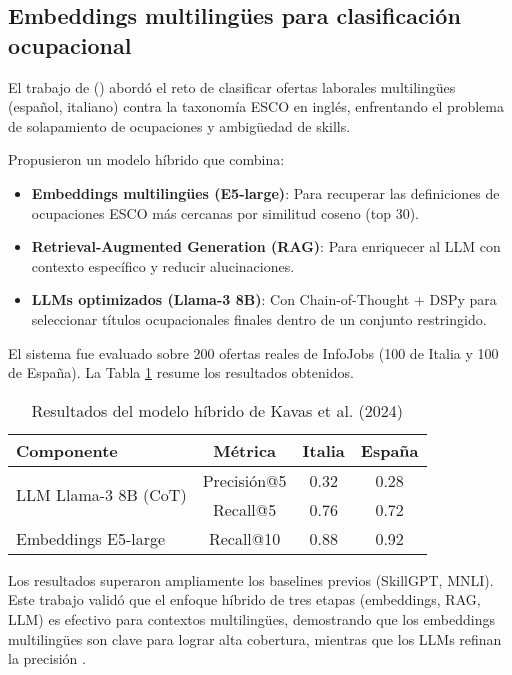 \subsection{Embeddings multilingües para clasificación ocupacional}

El trabajo de \citeauthor{kavas2024} (\citeyear{kavas2024}) abordó el reto de clasificar ofertas laborales multilingües (español, italiano) contra la taxonomía ESCO en inglés, enfrentando el problema de solapamiento de ocupaciones y ambigüedad de skills.

Propusieron un modelo híbrido que combina:

\begin{itemize}
    \item \textbf{Embeddings multilingües (E5-large)}: Para recuperar las definiciones de ocupaciones ESCO más cercanas por similitud coseno (top 30).
    \item \textbf{Retrieval-Augmented Generation (RAG)}: Para enriquecer al LLM con contexto específico y reducir alucinaciones.
    \item \textbf{LLMs optimizados (Llama-3 8B)}: Con Chain-of-Thought + DSPy para seleccionar títulos ocupacionales finales dentro de un conjunto restringido.
\end{itemize}

El sistema fue evaluado sobre 200 ofertas reales de InfoJobs (100 de Italia y 100 de España). La Tabla \ref{tab:kavas-results-ch4} resume los resultados obtenidos.

\begin{table}[H]
\centering
\caption{Resultados del modelo híbrido de Kavas et al. (2024)}
\label{tab:kavas-results-ch4}
\small
\begin{tabular}{|l|c|c|c|}
\hline
\textbf{Componente} & \textbf{Métrica} & \textbf{Italia} & \textbf{España} \\
\hline
\multirow{2}{*}{LLM Llama-3 8B (CoT)} & Precisión@5 & 0.32 & 0.28 \\
\cline{2-4}
 & Recall@5 & 0.76 & 0.72 \\
\hline
Embeddings E5-large & Recall@10 & 0.88 & 0.92 \\
\hline
\end{tabular}
\end{table}

Los resultados superaron ampliamente los baselines previos (SkillGPT, MNLI). Este trabajo validó que el enfoque híbrido de tres etapas (embeddings, RAG, LLM) es efectivo para contextos multilingües, demostrando que los embeddings multilingües son clave para lograr alta cobertura, mientras que los LLMs refinan la precisión \parencite{kavas2024}.

